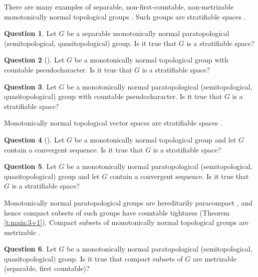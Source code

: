 \documentclass[preprint]{elsarticle}
\theoremstyle{definition}
\newtheorem{question}{Question}
\theoremstyle{remark}
\begin{document}
There are many examples of separable, non-first-countable, non-metrizable monotonically normal topological groups \cite{GartsideReznichenko2000nmfs}. Such groups are stratifiable spaces
\cite[Theorem 24]{GartsideReznichenko2000nmfs}.

\begin{question}\label{q:4}
Let $G$ be a separable monotonically normal paratopological (semitopological, quasitopological) group. Is it true that $G$ is a stratifiable space?
\end{question}

\begin{question}[{\cite[Problem 6]{Collins1996}}]\label{q:5}
Let $G$ be a monotonically normal topological group with countable pseudocharacter. Is it true that $G$ is a stratifiable space?
\end{question}


\begin{question}\label{q:6}
Let $G$ be a monotonically normal paratopological (semitopological, quasitopological) group with countable pseudocharacter. Is it true that $G$ is a stratifiable space?
\end{question}

Monotonically normal topological vector spaces are stratifiable spaces \cite[Theorem 1]{Shkarin2004}.

\begin{question}[{\cite[Remarks (2)]{Shkarin2004}}]\label{q:7}
Let $G$ be a monotonically normal topological group and let $G$ contain a convergent sequence. Is it true that $G$ is a stratifiable space?
\end{question}

\begin{question}\label{q:8}
Let $G$ be a monotonically normal paratopological (semitopological, quasitopological) group and let $G$ contain a convergent sequence. Is it true that $G$ is a stratifiable space?
\end{question}

Monotonically normal paratopological groups are hereditarily paracompact \cite[Theorem 2.6]{BuzyakovaVural2014}, and hence compact subsets of such groups have countable tightness \cite[Theorem 3.5]{WilliamsZhou1998} (Theorem \ref{t:main:3+1}). Compact subsets of monotonically normal topological groups are metrizable \cite[Theorem 2a]{Gartside1998}.

\begin{question}\label{q:9}
Let $G$ be a monotonically normal paratopological (semitopological, quasitopological) group. Is it true that compact subsets of $G$ are metrizable (separable, first countable)?
\end{question}
\end{document}
